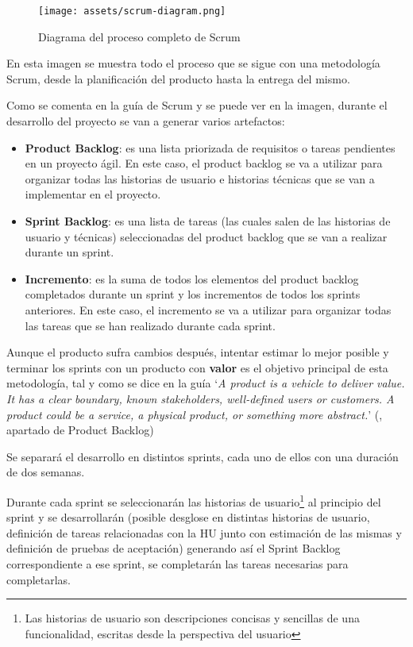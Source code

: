 \begin{figure}[H]
  \centering
  \texttt{[image: assets/scrum-diagram.png]}
  \caption{Diagrama del proceso completo de Scrum \parencite{scrum-diagram}}
  \label{fig:scrum-diagram}
\end{figure}

En esta imagen se muestra todo el proceso que se sigue con una metodología Scrum, desde la planificación del producto hasta la entrega del mismo.

Como se comenta en la guía de Scrum y se puede ver en la imagen, durante el desarrollo del proyecto se van a generar varios artefactos:
\begin{itemize}
    \item \textbf{Product Backlog}: es una lista priorizada de requisitos o tareas pendientes en un proyecto ágil. En este caso, el product backlog se va a utilizar para organizar todas las historias de usuario e historias técnicas que se van a implementar en el proyecto.
    \item \textbf{Sprint Backlog}: es una lista de tareas (las cuales salen de las historias de usuario y técnicas) seleccionadas del product backlog que se van a realizar durante un sprint.
    \item \textbf{Incremento}: es la suma de todos los elementos del product backlog completados durante un sprint y los incrementos de todos los sprints anteriores. En este caso, el incremento se va a utilizar para organizar todas las tareas que se han realizado durante cada sprint.
\end{itemize}
Aunque el producto sufra cambios después, intentar estimar lo mejor posible y terminar los sprints con un producto con \textbf{valor} es el objetivo principal de esta metodología, tal y como se dice en la guía `\textit{A product is a vehicle to deliver value. It has a clear boundary, known stakeholders, well-defined users or customers. A product could be a service, a physical product, or something more abstract.}' (\cite{scrum-guide}, apartado de Product Backlog)

Se separará el desarrollo en distintos sprints, cada uno de ellos con una duración de dos semanas.

Durante cada sprint se seleccionarán las historias de usuario\footnote{Las historias de usuario son descripciones concisas y sencillas de una funcionalidad, escritas desde la perspectiva del usuario} al principio del sprint y se desarrollarán (posible desglose en distintas historias de usuario, definición de tareas relacionadas con la HU junto con estimación de las mismas y definición de pruebas de aceptación) generando así el Sprint Backlog correspondiente a ese sprint, se completarán las tareas necesarias para completarlas.

